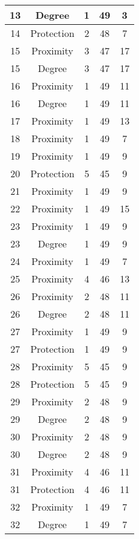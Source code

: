 \documentclass[results.tex]{subfiles}
\begin{document}
\begin{center}
\begin{tabular}{| c || c | c | c | c |}
    \hline
    13 & Degree & 1 & 49 & 3 \\ 
    \hline
    14 & Protection & 2 & 48 & 7 \\ 
    \hline
    15 & Proximity & 3 & 47 & 17 \\ 
    \hline
    15 & Degree & 3 & 47 & 17 \\ 
    \hline
    16 & Proximity & 1 & 49 & 11 \\ 
    \hline
    16 & Degree & 1 & 49 & 11 \\ 
    \hline
    17 & Proximity & 1 & 49 & 13 \\ 
    \hline
    18 & Proximity & 1 & 49 & 7 \\ 
    \hline
    19 & Proximity & 1 & 49 & 9 \\ 
    \hline
    20 & Protection & 5 & 45 & 9 \\ 
    \hline
    21 & Proximity & 1 & 49 & 9 \\ 
    \hline
    22 & Proximity & 1 & 49 & 15 \\ 
    \hline
    23 & Proximity & 1 & 49 & 9 \\ 
    \hline
    23 & Degree & 1 & 49 & 9 \\ 
    \hline
    24 & Proximity & 1 & 49 & 7 \\ 
    \hline
    25 & Proximity & 4 & 46 & 13 \\ 
    \hline
    26 & Proximity & 2 & 48 & 11 \\ 
    \hline
    26 & Degree & 2 & 48 & 11 \\ 
    \hline
    27 & Proximity & 1 & 49 & 9 \\ 
    \hline
    27 & Protection & 1 & 49 & 9 \\ 
    \hline
    28 & Proximity & 5 & 45 & 9 \\ 
    \hline
    28 & Protection & 5 & 45 & 9 \\ 
    \hline
    29 & Proximity & 2 & 48 & 9 \\ 
    \hline
    29 & Degree & 2 & 48 & 9 \\ 
    \hline
    30 & Proximity & 2 & 48 & 9 \\ 
    \hline
    30 & Degree & 2 & 48 & 9 \\ 
    \hline
    31 & Proximity & 4 & 46 & 11 \\ 
    \hline
    31 & Protection & 4 & 46 & 11 \\ 
    \hline
    32 & Proximity & 1 & 49 & 7 \\ 
    \hline
    32 & Degree & 1 & 49 & 7 \\ 

\end{tabular}
\end{center}
\end{document}

